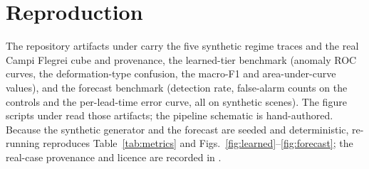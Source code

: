 \documentclass[journal]{IEEEtran}
\begin{document}
\appendices
\section{Reproduction}\label{app:repro}

The repository artifacts under  carry the five synthetic regime traces and the real Campi
Flegrei cube and provenance, the learned-tier benchmark (anomaly ROC curves, the deformation-type confusion, the
macro-F1 and area-under-curve values), and the forecast benchmark (detection rate, false-alarm counts on the
controls and the per-lead-time error curve, all on synthetic scenes). The figure scripts under  read those
artifacts; the pipeline schematic is hand-authored. Because the synthetic generator and the forecast are seeded
and deterministic, re-running reproduces Table~\ref{tab:metrics} and Figs.~\ref{fig:learned}--\ref{fig:forecast};
the real-case provenance and licence are recorded in .

\balance
\end{document}
